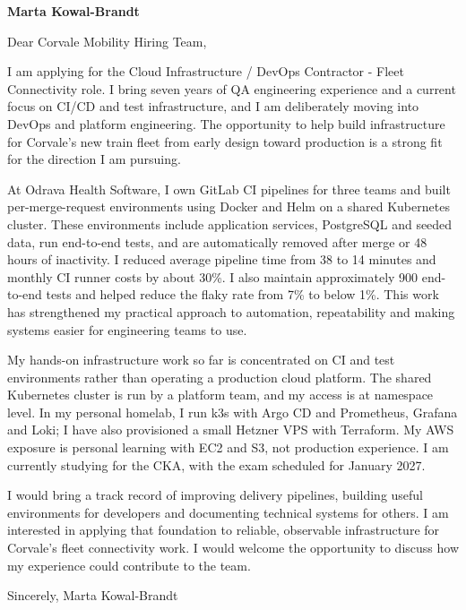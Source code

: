 \documentclass[11pt,a4paper]{article}
\begin{document}
{\Large\bfseries\color{sectioncolor} Marta Kowal-Brandt}\par

Dear Corvale Mobility Hiring Team,

I am applying for the Cloud Infrastructure / DevOps Contractor - Fleet Connectivity role. I bring seven years of QA engineering experience and a current focus on CI/CD and test infrastructure, and I am deliberately moving into DevOps and platform engineering. The opportunity to help build infrastructure for Corvale's new train fleet from early design toward production is a strong fit for the direction I am pursuing.

At Odrava Health Software, I own GitLab CI pipelines for three teams and built per-merge-request environments using Docker and Helm on a shared Kubernetes cluster. These environments include application services, PostgreSQL and seeded data, run end-to-end tests, and are automatically removed after merge or 48 hours of inactivity. I reduced average pipeline time from 38 to 14 minutes and monthly CI runner costs by about 30\%. I also maintain approximately 900 end-to-end tests and helped reduce the flaky rate from 7\% to below 1\%. This work has strengthened my practical approach to automation, repeatability and making systems easier for engineering teams to use.

My hands-on infrastructure work so far is concentrated on CI and test environments rather than operating a production cloud platform. The shared Kubernetes cluster is run by a platform team, and my access is at namespace level. In my personal homelab, I run k3s with Argo CD and Prometheus, Grafana and Loki; I have also provisioned a small Hetzner VPS with Terraform. My AWS exposure is personal learning with EC2 and S3, not production experience. I am currently studying for the CKA, with the exam scheduled for January 2027.

I would bring a track record of improving delivery pipelines, building useful environments for developers and documenting technical systems for others. I am interested in applying that foundation to reliable, observable infrastructure for Corvale's fleet connectivity work. I would welcome the opportunity to discuss how my experience could contribute to the team.

Sincerely,
Marta Kowal-Brandt
\end{document}
